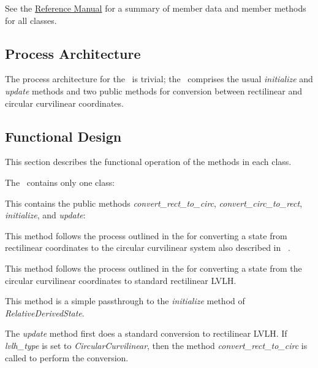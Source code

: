 
%
%
% 
%

See the \href{file:refman.pdf}{Reference Manual}\cite{derivedstatebib:ReferenceManual} for a summary of member data and member methods for all classes.  

\subsection{Process Architecture}
The process architecture for the \LRDSDesc\ is trivial; the \LRDSDesc\
comprises the usual \textit{initialize} and \textit{update} methods
and two public methods for conversion between rectilinear and circular
curvilinear coordinates.

\subsection{Functional Design}
This section describes the functional operation of the methods in each class.

The \LRDSDesc\ contains only one class:
\begin{itemize}

This contains the public methods \textit{convert\_rect\_to\_circ},
\textit{convert\_circ\_to\_rect}, \textit{initialize}, and \textit{update}:
\begin{enumerate}

This method follows the process outlined in the
 for
converting a state from rectilinear coordinates to the circular curvilinear
system also described in ~\textref{math section}{sec:Lrdsmath}.

This method follows the process outlined in the
 for
converting a state from the circular curvilinear coordinates to
standard rectilinear LVLH.

This method is a simple passthrough to the \textit{initialize} method of
\textit{RelativeDerivedState}.

The \textit{update} method first does a standard conversion to rectilinear
LVLH. If \textit{lvlh\_type} is set to \textit{CircularCurvilinear},
then the method \textit{convert\_rect\_to\_circ} is called to perform the
conversion.

\end{enumerate}
\end{itemize}
